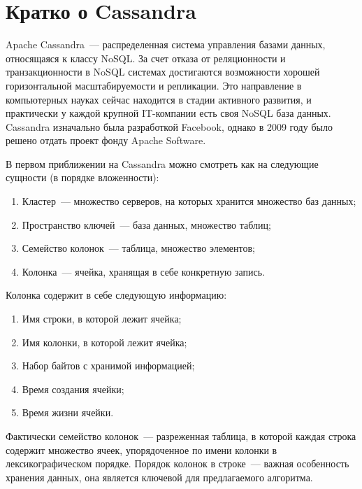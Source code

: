 \section{Кратко о Cassandra}

Apache Cassandra~--- распределенная система управления базами данных, относящаяся к классу NoSQL. За счет отказа от реляционности и транзакционности в NoSQL системах достигаются возможности хорошей горизонтальной масштабируемости и репликации. Это направление в компьютерных науках сейчас находится в стадии активного развития, и практически у каждой крупной IT-компании есть своя NoSQL база данных. Cassandra изначально была разработкой Facebook, однако в 2009 году было решено отдать проект фонду Apache Software.

В первом приближении на Cassandra можно смотреть как на следующие сущности (в порядке вложенности):

\begin{enumerate}
	\item Кластер~--- множество серверов, на которых хранится множество баз данных;
	\item Пространство ключей~--- база данных, множество таблиц;
	\item Семейство колонок~--- таблица, множество элементов;
	\item Колонка~--- ячейка, хранящая в себе конкретную запись.
\end{enumerate}

Колонка содержит в себе следующую информацию:

\begin{enumerate}
	\item Имя строки, в которой лежит ячейка;
	\item Имя колонки, в которой лежит ячейка;
	\item Набор байтов с хранимой информацией;
	\item Время создания ячейки;
	\item Время жизни ячейки.
\end{enumerate}

Фактически семейство колонок~--- разреженная таблица, в которой каждая строка содержит множество ячеек, упорядоченное по имени колонки в лексикографическом порядке. Порядок колонок в строке~--- важная особенность хранения данных, она является ключевой для предлагаемого алгоритма.